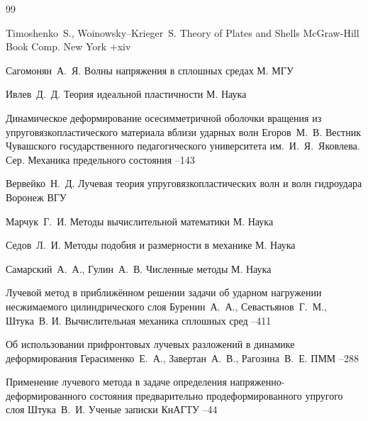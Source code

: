 \begin{thebibliography}{99}

\by Timoshenko~S., Woinowsky--Krieger~S.
\book Theory of Plates and Shells
\publ McGraw-Hill Book Comp.
\publaddr New York
+xiv

\by Сагомонян~А.~Я.
\book Волны напряжения в сплошных средах
\publaddr М.
\publ МГУ



\by Ивлев~Д.~Д.
\book Теория идеальной пластичности
\publaddr М.
\publ Наука


\paper Динамическое деформирование осесимметричной оболочки вращения из упруговязкопластического материала вблизи ударных волн
\by    Егоров~М.~В.
\jour  Вестник Чувашского государственного педагогического университета им.~И.~Я.~Яковлева. Сер. Механика предельного состояния
--143

\by Вервейко~Н.~Д.
\book Лучевая теория упруговязкопластических волн и волн гидроудара
\publaddr Воронеж
\publ ВГУ

\by Марчук~Г.~И.
\book Методы вычислительной математики
\publaddr М.
\publ Наука

\by Седов~Л.~И.
\book Методы подобия и размерности в механике
\publaddr М.
\publ Наука


\by Самарский~А.~А., Гулин~А.~В.
\book Численные методы
\publaddr М.
\publ Наука

\paper Лучевой метод в приближённом решении задачи об ударном нагружении несжимаемого цилиндрического слоя
\by Буренин~А.~А., Севастьянов~Г.~М., Штука~В. И.
\jour Вычислительная механика сплошных сред
--411 

\paper Об использовании прифронтовых лучевых разложений в динамике деформирования
\by Герасименко~Е.~А., Завертан~А.~В., Рагозина~В.~Е.
\jour ПММ
--288

\paper Применение лучевого метода в задаче определения напряженно-деформированного состояния предварительно продеформированного упругого слоя
\by    Штука~В.~И.
\jour Ученые записки КнАГТУ
--44


\end{thebibliography}
